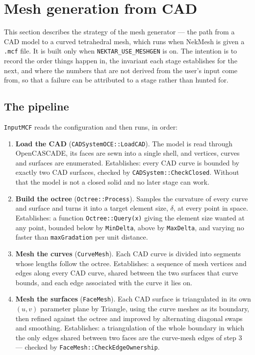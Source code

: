 {\section{Mesh generation from CAD}
\label{sect:meshgen}

This section describes the strategy of the mesh generator --- the path from
a CAD model to a curved tetrahedral mesh, which runs when NekMesh is given a
\texttt{.mcf} file. It is built only when \texttt{NEKTAR\_USE\_MESHGEN} is
on. The intention is to record the order things happen in, the invariant each
stage establishes for the next, and where the numbers that are not derived
from the user's input come from, so that a failure can be attributed to a
stage rather than hunted for.

\subsection{The pipeline}

\texttt{InputMCF} reads the configuration and then runs, in order:

\begin{enumerate}
\item \textbf{Load the CAD} (\texttt{CADSystemOCE::LoadCAD}). The model is
  read through OpenCASCADE, its faces are sewn into a single shell, and
  vertices, curves and surfaces are enumerated. Establishes: every CAD curve
  is bounded by exactly two CAD surfaces, checked by
  \texttt{CADSystem::CheckClosed}. Without that the model is not a closed
  solid and no later stage can work.

\item \textbf{Build the octree} (\texttt{Octree::Process}). Samples the
  curvature of every curve and surface and turns it into a target element
  size, $\delta$, at every point in space. Establishes: a function
  \texttt{Octree::Query(x)} giving the element size wanted at any point,
  bounded below by \texttt{MinDelta}, above by \texttt{MaxDelta}, and varying
  no faster than \texttt{maxGradation} per unit distance.

\item \textbf{Mesh the curves} (\texttt{CurveMesh}). Each CAD curve is
  divided into segments whose lengths follow the octree. Establishes: a
  sequence of mesh vertices and edges along every CAD curve, shared between
  the two surfaces that curve bounds, and each edge associated with the curve
  it lies on.

\item \textbf{Mesh the surfaces} (\texttt{FaceMesh}). Each CAD surface is
  triangulated in its own $(u,v)$ parameter plane by Triangle, using the
  curve meshes as its boundary, then refined against the octree and improved
  by alternating diagonal swaps and smoothing. Establishes: a triangulation
  of the whole boundary in which the only edges shared between two faces are
  the curve-mesh edges of step 3 --- checked by
  \texttt{FaceMesh::CheckEdgeOwnership}.


\end{enumerate}}
